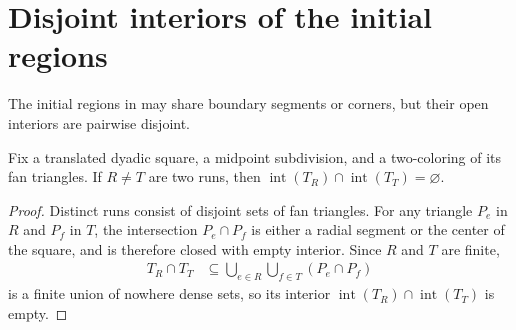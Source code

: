 \section{Disjoint interiors of the initial regions}
\label{sec:area_law_initial_region_interiors}

The initial regions in \cite[Section~11]{OpenAI2026AreaLaw} may share
boundary segments or corners, but their open interiors are pairwise disjoint.


\begin{lemma}
    \label{thm:area_law_fan_run_disjoint_interiors}
    \leanok
    Fix a translated dyadic square, a midpoint subdivision, and a
    two-coloring of its fan triangles. If $R\ne T$ are two runs, then
    $\operatorname{int}(T_R)\cap\operatorname{int}(T_T)=\varnothing$.
\end{lemma}
\begin{proof}\leanok
    Distinct runs consist of disjoint sets of fan triangles. For any
    triangle $P_e$ in $R$ and $P_f$ in $T$, the intersection $P_e\cap P_f$
    is either a radial segment or the center of the square, and is therefore
    closed with empty interior. Since $R$ and $T$ are finite,
    \begin{align}
        T_R\cap T_T
         & \subseteq\bigcup_{e\in R}\bigcup_{f\in T}(P_e\cap P_f)
    \end{align}
    is a finite union of nowhere dense sets, so its interior
    $\operatorname{int}(T_R)\cap\operatorname{int}(T_T)$ is empty.
\end{proof}

